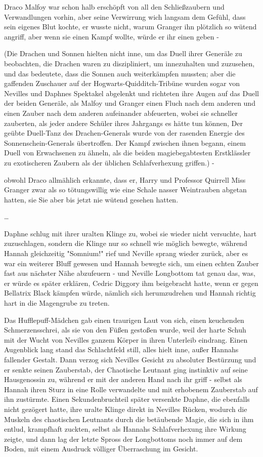 {Draco Malfoy war schon halb erschöpft von all den Schließzaubern und Verwandlungen vorhin, aber seine Verwirrung wich langsam dem Gefühl, dass sein eigenes Blut kochte, er wusste nicht, warum Granger ihn plötzlich so wütend angriff, aber wenn sie einen Kampf wollte, würde er ihr einen geben -

(Die Drachen und Sonnen hielten nicht inne, um das Duell ihrer Generäle zu beobachten, die Drachen waren zu diszipliniert, um innezuhalten und zuzusehen, und das bedeutete, dass die Sonnen auch weiterkämpfen mussten; aber die gaffenden Zuschauer auf der Hogwarts-Quidditch-Tribüne wurden sogar von Nevilles und Daphnes Spektakel abgelenkt und richteten ihre Augen auf das Duell der beiden Generäle, als Malfoy und Granger einen Fluch nach dem anderen und einen Zauber nach dem anderen aufeinander abfeuerten, wobei sie schneller zauberten, als jeder andere Schüler ihres Jahrgangs es hätte tun können, Der geübte Duell-Tanz des Drachen-Generals wurde von der rasenden Energie des Sonnenschein-Generals übertroffen. Der Kampf zwischen ihnen begann, einem Duell von Erwachsenen zu ähneln, als die beiden magiebegabtesten Erstklässler zu exotischeren Zaubern als der üblichen Schlafverhexung griffen.) -

obwohl Draco allmählich erkannte, dass er, Harry und Professor Quirrell Miss Granger zwar als so tötungswillig wie eine Schale nasser Weintrauben abgetan hatten, sie Sie aber bis jetzt nie wütend gesehen hatten.

…

Daphne schlug mit ihrer uralten Klinge zu, wobei sie wieder nicht versuchte, hart zuzuschlagen, sondern die Klinge nur so schnell wie möglich bewegte, während Hannah gleichzeitig "Somnium!" rief und Neville sprang wieder zurück, aber es war ein weiterer Bluff gewesen und Hannah bewegte sich, um einen echten Zauber fast aus nächster Nähe abzufeuern - und Neville Longbottom tat genau das, was, er würde es später erklären, Cedric Diggory ihm beigebracht hatte, wenn er gegen Bellatrix Black kämpfen würde, nämlich sich herumzudrehen und Hannah richtig hart in die Magengrube zu treten.

Das Hufflepuff-Mädchen gab einen traurigen Laut von sich, einen keuchenden Schmerzensschrei, als sie von den Füßen gestoßen wurde, weil der harte Schuh mit der Wucht von Nevilles ganzem Körper in ihren Unterleib eindrang. Einen Augenblick lang stand das Schlachtfeld still, alles hielt inne, außer Hannahs fallender Gestalt. Dann verzog sich Nevilles Gesicht zu absoluter Bestürzung und er senkte seinen Zauberstab, der Chaotische Leutnant ging instinktiv auf seine Hausgenossin zu, während er mit der anderen Hand nach ihr griff - selbst als Hannah ihren Sturz in eine Rolle verwandelte und mit erhobenem Zauberstab auf ihn zustürmte. Einen Sekundenbruchteil später versenkte Daphne, die ebenfalls nicht gezögert hatte, ihre uralte Klinge direkt in Nevilles Rücken, wodurch die Muskeln des chaotischen Leutnants durch die betäubende Magie, die sich in ihm entlud, krampfhaft zuckten, selbst als Hannahs Schlafverhexung ihre Wirkung zeigte, und dann lag der letzte Spross der Longbottoms noch immer auf dem Boden, mit einem Ausdruck völliger Überraschung im Gesicht.

}
